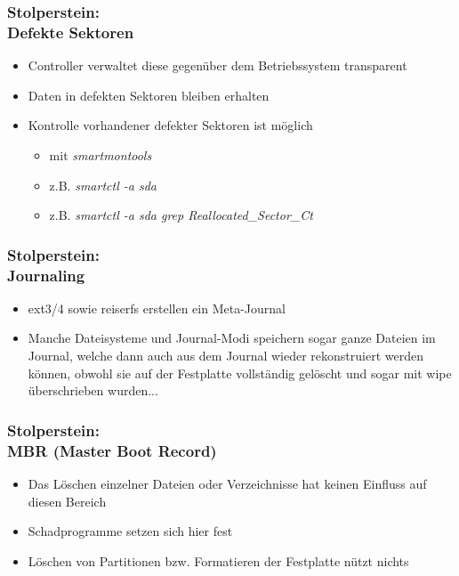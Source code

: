 \begin{frame}
  \frametitle{Stolperstein:\\Defekte Sektoren}
  \begin{itemize}
    \item Controller verwaltet diese gegenüber dem Betriebssystem transparent
    \item Daten in defekten Sektoren bleiben erhalten
    \item Kontrolle vorhandener defekter Sektoren ist möglich
    \begin{itemize}
      \item mit \textit{smartmontools}
      \item z.B. \textit{smartctl -a sda}
      \item z.B. \textit{smartctl -a sda  grep Reallocated\_Sector\_Ct}
    \end{itemize}
  \end{itemize}
\end{frame}

\begin{frame}
  \frametitle{Stolperstein:\\Journaling}
  \begin{itemize}
    \item ext3/4 sowie reiserfs erstellen ein Meta-Journal
    \item Manche Dateisysteme und Journal-Modi speichern sogar ganze Dateien im Journal, welche dann auch aus dem Journal wieder rekonstruiert werden können, obwohl sie auf der Festplatte vollständig gelöscht und sogar mit wipe überschrieben wurden...
  \end{itemize}
\end{frame}

\begin{frame}
  \frametitle{Stolperstein:\\MBR (Master Boot Record)}
  \begin{itemize}
    \item Das Löschen einzelner Dateien oder Verzeichnisse hat keinen Einfluss auf diesen Bereich
    \item Schadprogramme setzen sich hier fest
    \item Löschen von Partitionen bzw. Formatieren der Festplatte nützt nichts
  \end{itemize}
\end{frame}

